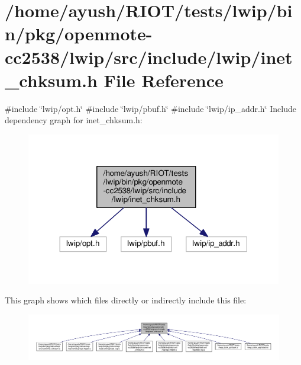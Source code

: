 \hypertarget{openmote-cc2538_2lwip_2src_2include_2lwip_2inet__chksum_8h}{}\section{/home/ayush/\+R\+I\+O\+T/tests/lwip/bin/pkg/openmote-\/cc2538/lwip/src/include/lwip/inet\+\_\+chksum.h File Reference}
\label{openmote-cc2538_2lwip_2src_2include_2lwip_2inet__chksum_8h}
{\ttfamily \#include \char`\"{}lwip/opt.\+h\char`\"{}}\newline
{\ttfamily \#include \char`\"{}lwip/pbuf.\+h\char`\"{}}\newline
{\ttfamily \#include \char`\"{}lwip/ip\+\_\+addr.\+h\char`\"{}}\newline
Include dependency graph for inet\+\_\+chksum.\+h\+:
\nopagebreak
\begin{figure}[H]
\begin{center}
\leavevmode
\includegraphics[width=317pt]{openmote-cc2538_2lwip_2src_2include_2lwip_2inet__chksum_8h__incl}
\end{center}
\end{figure}
This graph shows which files directly or indirectly include this file\+:
\nopagebreak
\begin{figure}[H]
\begin{center}
\leavevmode
\includegraphics[width=350pt]{openmote-cc2538_2lwip_2src_2include_2lwip_2inet__chksum_8h__dep__incl}
\end{center}
\end{figure}
